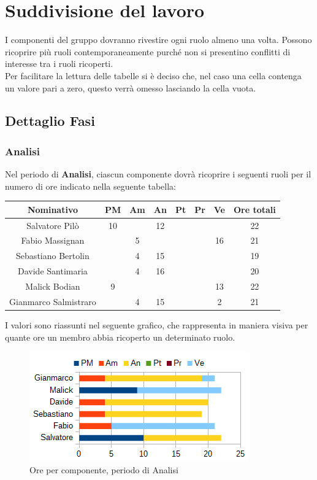 \section{Suddivisione del lavoro}
I componenti del gruppo dovranno rivestire ogni ruolo almeno una volta. Possono ricoprire più ruoli contemporaneamente purché non si presentino conflitti di interesse tra i ruoli ricoperti. \\
Per facilitare la lettura delle tabelle si è deciso che, nel caso una cella contenga un valore pari a zero, questo verrà omesso lasciando la cella vuota.
	\subsection{Dettaglio Fasi}
		\subsubsection{Analisi}
		Nel periodo di \textbf{Analisi}, ciascun componente dovrà ricoprire i seguenti ruoli per il numero di ore indicato nella seguente tabella: \\
		\begin{table}[H]
		\centering
		\begin{tabular}{|c|c|c|c|c|c|c|c|}
			\hline
			\textbf{Nominativo}		& \textbf{PM}	& \textbf{Am}	& \textbf{An}	& \textbf{Pt}	& \textbf{Pr}	& \textbf{Ve}	& \textbf{Ore totali}     \\
			\hline
			Salvatore Pilò			& 10	& 		& 12	&		&		&		& 22 \\
			Fabio Massignan			&		& 5		&		&		&		& 16	& 21 \\
			Sebastiano Bertolin		&		& 4		& 15	&		&		&		& 19 \\
			Davide Santimaria		&		& 4		& 16	&		&		&		& 20 \\
			Malick Bodian			& 9		&		&		&		&		& 13	& 22 \\
			Gianmarco Salmistraro	&		& 4		& 15	&		&		& 2		& 21 \\
			\hline
		\end{tabular}
		\end{table}
		I valori sono riassunti nel seguente grafico, che rappresenta in maniera visiva per quante ore un membro abbia ricoperto un determinato ruolo. \\
		\begin{figure}[H]
			\centering
			\includegraphics[width=1\linewidth]{immagini/grafici/analisi-barra.png}
			\caption{Ore per componente, periodo di Analisi}
		\end{figure}

